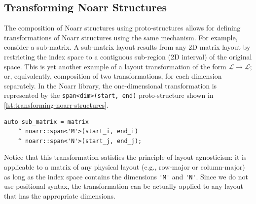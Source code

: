 \subsection{Transforming Noarr Structures}\label{sec:transforming-noarr-structures}

The composition of Noarr structures using proto-structures allows for defining transformations of Noarr structures using the same mechanism. For example, consider a sub-matrix. A sub-matrix layout results from any 2D matrix layout by restricting the index space to a contiguous sub-region (2D interval) of the original space. This is yet another example of a layout transformation of the form $\mathcal{L} \to \mathcal{L}$; or, equivalently, composition of two transformations, for each dimension separately. In the Noarr library, the one-dimensional transformation is represented by the \lstinline{span<dim>(start, end)} proto-structure shown in \cref{lst:transforming-noarr-structures}.

\begin{lstlisting}[style=C++, caption={Transforming Noarr structures using proto-structures.}, label={lst:transforming-noarr-structures}]
auto sub_matrix = matrix
    ^ noarr::span<'M'>(start_i, end_i)
    ^ noarr::span<'N'>(start_j, end_j);
\end{lstlisting}

Notice that this transformation satisfies the principle of layout agnosticism: it is applicable to a matrix of any physical layout (e.g., row-major or column-major) as long as the index space contains the dimensions \lstinline{'M'} and \lstinline{'N'}. Since we do not use positional syntax, the transformation can be actually applied to any layout that has the appropriate dimensions.


